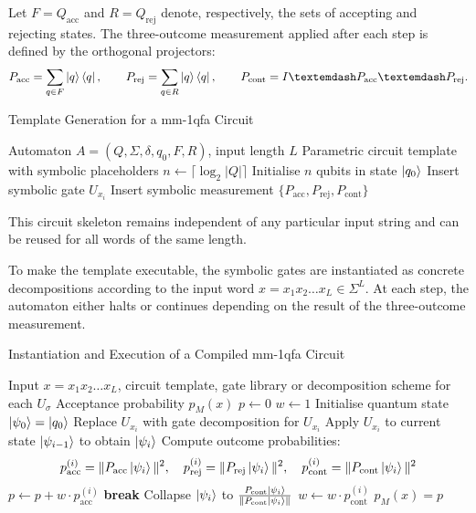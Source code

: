Let $F = Q_{\text{acc}}$ and $R = Q_{\text{rej}}$ denote, respectively, the sets of accepting and rejecting states. The three-outcome measurement applied after each step is defined by the orthogonal projectors:
\[
P_{\text{acc}} = \sum_{q \in F} \ket{q}\bra{q}, \qquad
P_{\text{rej}} = \sum_{q \in R} \ket{q}\bra{q}, \qquad
P_{\text{cont}} = I—P_{\text{acc}}—P_{\text{rej}}.
\]

\begin{algorithm}[H]
\caption{Template Generation for a \gls{mm-1qfa} Circuit}
\label{alg:mmqfa-template}
\begin{algorithmic}[1]
\Require Automaton $A = (Q, \Sigma, \delta, q_0, F, R)$,\; input length $L$
\Ensure Parametric circuit template with symbolic placeholders
\State $n \gets \lceil \log_2 |Q| \rceil$
\State Initialise $n$ qubits in state $\ket{q_0}$
   \State Insert symbolic gate $\boxed{U_{x_i}}$
   \State Insert symbolic measurement $\{P_{\text{acc}}, P_{\text{rej}}, P_{\text{cont}}\}$
\EndFor
\end{algorithmic}
\end{algorithm}

This circuit skeleton remains independent of any particular input string and can be reused for all words of the same length.

\medskip

To make the template executable, the symbolic gates are instantiated as concrete decompositions according to the input word $x = x_1x_2\dots x_L \in \Sigma^L$. At each step, the automaton either halts or continues depending on the result of the three-outcome measurement.
\begin{algorithm}[H]
  \caption{Instantiation and Execution of a Compiled \gls{mm-1qfa} Circuit}
  \label{alg:mmqfa-instantiation}
  \begin{algorithmic}[1]
  \Require Input $x = x_1x_2\dots x_L$, circuit template, gate library or decomposition scheme for each $U_\sigma$
  \Ensure Acceptance probability $p_M(x)$
  \State $p \gets 0$ 
  \State $w \gets 1$ 
  \State Initialise quantum state $\ket{\psi_0} = \ket{q_0}$
     \State Replace $\boxed{U_{x_i}}$ with gate decomposition for $U_{x_i}$
     \State Apply $U_{x_i}$ to current state $\ket{\psi_{i-1}}$ to obtain $\ket{\psi_i}$
     \State Compute outcome probabilities:
     \[
        p_{\text{acc}}^{(i)} = \|P_{\text{acc}} \ket{\psi_i}\|^2, \quad
        p_{\text{rej}}^{(i)} = \|P_{\text{rej}} \ket{\psi_i}\|^2, \quad
        p_{\text{cont}}^{(i)} = \|P_{\text{cont}} \ket{\psi_i}\|^2
     \]
     \State $p \gets p + w \cdot p_{\text{acc}}^{(i)}$
        \State \textbf{break} 
     \Else
        \State Collapse $\ket{\psi_i}$ to $\frac{P_{\text{cont}} \ket{\psi_i}}{\|P_{\text{cont}} \ket{\psi_i}\|}$
        \State $w \gets w \cdot p_{\text{cont}}^{(i)}$
     \EndIf
  \EndFor
  \State \Return $p_M(x) = p$
  \end{algorithmic}
\end{algorithm}

